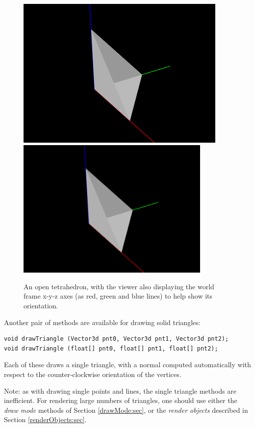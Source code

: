 %
\begin{figure}[t]
\begin{center}
\iflatexml
 \includegraphics[]{images/drawOpenTet}
\else
 \includegraphics[width=3.75in]{images/drawOpenTet}
\fi
\end{center}
\caption{An open tetrahedron, with the viewer also displaying the world
frame x-y-z axes (as red, green and blue lines) to help show its
orientation.}
\label{drawOpenTet:fig}
\end{figure}
%

Another pair of methods are available for drawing solid triangles:
%
\begin{lstlisting}[]
void drawTriangle (Vector3d pnt0, Vector3d pnt1, Vector3d pnt2);
void drawTriangle (float[] pnt0, float[] pnt1, float[] pnt2);
\end{lstlisting}
%
Each of these draws a single triangle, with a normal computed
automatically with respect to the counter-clockwise orientation of the
vertices.

\begin{sideblock}
Note: as with drawing single points and lines, the single triangle
methods are inefficient. For rendering large numbers of triangles, one
should use either the {\it draw mode} methods of Section
\ref{drawMode:sec}, or the {\it render objects} described in Section
\ref{renderObjects:sec}.
\end{sideblock}

